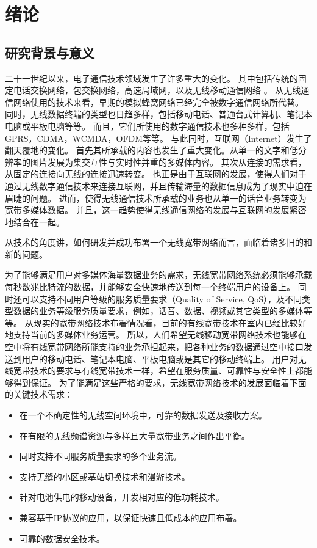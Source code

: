 \chapter{绪论}
\section{研究背景与意义}
二十一世纪以来，电子通信技术领域发生了许多重大的变化。
其中包括传统的固定电话交换网络，包交换网络，高速局域网，以及无线移动通信网络 \cite{LiShengLi2011}\cite{DingQi2010}。
从无线通信网络使用的技术来看，早期的模拟蜂窝网络已经完全被数字通信网络所代替。
同时，无线数据终端的类型也日趋多样，包括移动电话、普通台式计算机、笔记本电脑或平板电脑等等。
而且，它们所使用的数字通信技术也多种多样，包括GPRS，CDMA，WCMDA，OFDM等等。
与此同时，互联网（Internet）发生了翻天覆地的变化。
首先其所承载的内容也发生了重大变化。从单一的文字和低分辨率的图片发展为集交互性与实时性并重的多媒体内容。
其次从连接的需求看，从固定的连接向无线的连接迅速转变。
也正是由于互联网的发展，使得人们对于通过无线数字通信技术来连接互联网，并且传输海量的数据信息成为了现实中迫在眉睫的问题。
进而，使得无线通信技术所承载的业务也从单一的话音业务转变为宽带多媒体数据。
并且，这一趋势使得无线通信网络的发展与互联网的发展紧密地结合在一起。
\par 从技术的角度讲，如何研发并成功布署一个无线宽带网络而言，面临着诸多旧的和新的问题。
\par 为了能够满足用户对多媒体海量数据业务的需求，无线宽带网络系统必须能够承载每秒数兆比特流的数据，并能够安全快速地传送到每一个终端用户的设备上。
同时还可以支持不同用户等级的服务质量要求（Quality of Service, QoS），及不同类型数据的业务等级服务质量要求，例如，话音、数据、视频或其它类型的多媒体等等。
从现实的宽带网络技术布署情况看，目前的有线宽带技术在室内已经比较好地支持当前的多媒体业务运营。
所以，人们希望无线移动宽带网络技术也能够在空中将有线宽带网络所能支持的业务承担起来，把各种业务的数据通过空中接口发送到用户的移动电话、笔记本电脑、平板电脑或是其它的移动终端上。
用户对无线宽带技术的要求与有线宽带技术一样，希望在服务质量、可靠性与安全性上都能够得到保证。
为了能满足这些严格的要求，无线宽带网络技术的发展面临着下面的关键技术需求：
\begin{itemize}
\item   在一个不确定性的无线空间环境中，可靠的数据发送及接收方案。
\item   在有限的无线频谱资源与多样且大量宽带业务之间作出平衡。
\item   同时支持不同服务质量要求的多个业务流。
\item   支持无缝的小区或基站切换技术和漫游技术。
\item   针对电池供电的移动设备，开发相对应的低功耗技术。
\item   兼容基于IP协议的应用，以保证快速且低成本的应用布署。
\item   可靠的数据安全技术。
\end{itemize}

